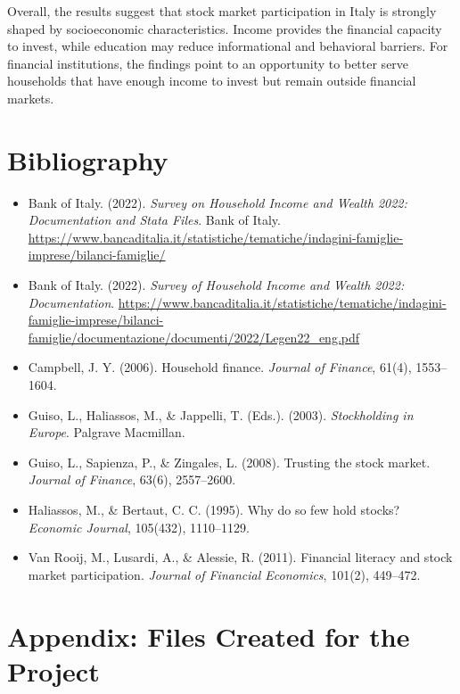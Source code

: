 \documentclass[12pt]{article}
\begin{document}
Overall, the results suggest that stock market participation in Italy is strongly shaped by socioeconomic characteristics. Income provides the financial capacity to invest, while education may reduce informational and behavioral barriers. For financial institutions, the findings point to an opportunity to better serve households that have enough income to invest but remain outside financial markets.

\section{Bibliography}

\begin{itemize}[leftmargin=*]
    \item Bank of Italy. (2022). \textit{Survey on Household Income and Wealth 2022: Documentation and Stata Files}. Bank of Italy. \url{https://www.bancaditalia.it/statistiche/tematiche/indagini-famiglie-imprese/bilanci-famiglie/}
    \item Bank of Italy. (2022). \textit{Survey of Household Income and Wealth 2022: Documentation}. \url{https://www.bancaditalia.it/statistiche/tematiche/indagini-famiglie-imprese/bilanci-famiglie/documentazione/documenti/2022/Legen22_eng.pdf}
    \item Campbell, J. Y. (2006). Household finance. \textit{Journal of Finance}, 61(4), 1553--1604.
    \item Guiso, L., Haliassos, M., \& Jappelli, T. (Eds.). (2003). \textit{Stockholding in Europe}. Palgrave Macmillan.
    \item Guiso, L., Sapienza, P., \& Zingales, L. (2008). Trusting the stock market. \textit{Journal of Finance}, 63(6), 2557--2600.
    \item Haliassos, M., \& Bertaut, C. C. (1995). Why do so few hold stocks? \textit{Economic Journal}, 105(432), 1110--1129.
    \item Van Rooij, M., Lusardi, A., \& Alessie, R. (2011). Financial literacy and stock market participation. \textit{Journal of Financial Economics}, 101(2), 449--472.
\end{itemize}

\appendix

\section{Appendix: Files Created for the Project}
\end{document}
